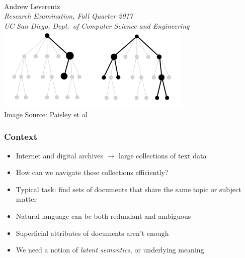 \begin{frame}
\vspace{3em}
\begin{center}
 \\[1em]
Andrew Leverentz \\[1em]
{ \small
\emph{Research Examination, Fall Quarter 2017} \\
\emph{UC San Diego, Dept.\ of Computer Science and Engineering}} \\[2em]
\includegraphics[width=0.7\textwidth]{../figures/title_image.png} \\[1em]
{\color[rgb]{0.5,0.5,0.5} \tiny Image Source: Paisley et al \cite{paisley2015nhdp}}
\end{center}
\end{frame}

\begin{frame}
\frametitle{Context}
\begin{itemize}[<+->]
\item Internet and digital archives $\rightarrow$ large collections of text data
\item How can we navigate these collections efficiently?
\item Typical task: find sets of documents that share the same topic or subject matter
\item Natural language can be both redundant and ambiguous
\item Superficial attributes of documents aren't enough
\item We need a notion of \emph{latent semantics}, or underlying meaning
\end{itemize}
\end{frame}

